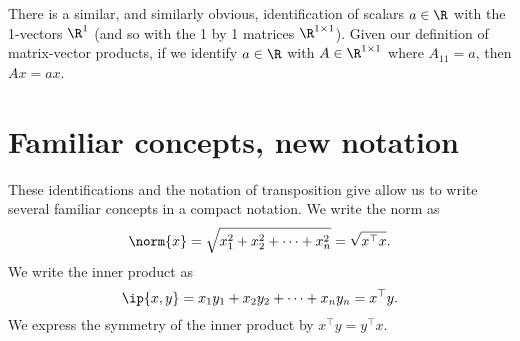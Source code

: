 There is a similar, and similarly obvious, identification of scalars $a \in \R $ with the 1-vectors $\R ^{1}$ (and so with the 1 by 1 matrices $\R ^{1 \times  1}$).
Given our definition of matrix-vector products, if we identify $a \in \R $ with $A \in \R ^{1 \times  1}$ where $A_{11} = a$, then $Ax = ax$.

\section*{Familiar concepts, new notation}

These identifications and the notation of transposition give allow us to write several familiar concepts in a compact notation.
We write the norm as
\[
\norm{x} = \sqrt{x_1^2 + x_2^2 + \cdots + x_n^2} = \sqrt{x^\top  x}.
\]
We write the inner product as
\[
\ip{x,y} =
x_1y_1 + x_2y_2 + \cdots + x_ny_n
= x^\top  y.
\]
We express the symmetry of the inner product by $x^\top  y = y^\top  x$.
